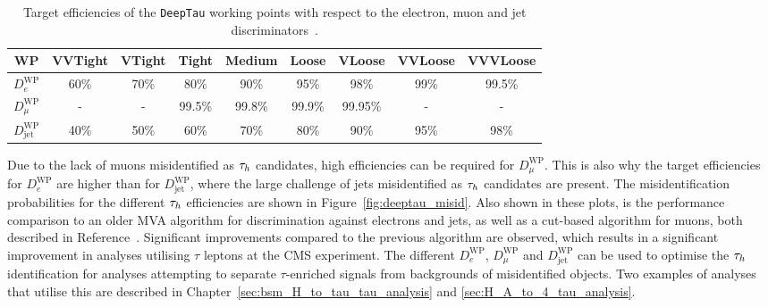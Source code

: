 \begin{table}[t]
\begin{adjustwidth}{-1cm}{-1cm}
\centering
\begin{tabular}{|c|cccccccc|}
\hline
WP                     & VVTight & VTight & Tight  & Medium & Loose  & VLoose  & VVLoose & VVVLoose \\
\hline 
\hline
$D_{e}^{\text{WP}}$    & 60\%    & 70\%   & 80\%   & 90\%   & 95\%   & 98\%    & 99\%    & 99.5\%   \\
$D_{\mu}^{\text{WP}}$  & -       & -      & 99.5\% & 99.8\% & 99.9\% & 99.95\% & -       & -        \\
$D_{\text{jet}}^{\text{WP}}$ & 40\%    & 50\%   & 60\%   & 70\%   & 80\%   & 90\%    & 95\%    & 98\%     \\
\hline
\end{tabular}
\end{adjustwidth}
\caption[Target efficiencies of the \texttt{DeepTau} working points.]{Target efficiencies of the \texttt{DeepTau} working points with respect to the electron, muon and jet discriminators~\cite{CMS:2022prd}.}
\label{tab:deeptau_eff}
\end{table}

Due to the lack of muons misidentified as $\tau_{h}$ candidates, high efficiencies can be required for $D_{\mu}^{\text{WP}}$.
This is also why the target efficiencies for $D_{e}^{\text{WP}}$ are higher than for $D_{\text{jet}}^{\text{WP}}$, where the large challenge of jets misidentified as $\tau_{h}$ candidates are present.
The misidentification probabilities for the different $\tau_{h}$ efficiencies are shown in Figure~\ref{fig:deeptau_misid}.
Also shown in these plots, is the performance comparison to an older \ac{MVA} algorithm for discrimination against electrons and jets, as well as a cut-based algorithm for muons, both described in Reference~\cite{CMS:2018jrd}.
Significant improvements compared to the previous algorithm are observed, which results in a significant improvement in analyses utilising $\tau$ leptons at the \ac{CMS} experiment.
The different $D_{e}^{\text{WP}}$, $D_{\mu}^{\text{WP}}$ and $D_{\text{jet}}^{\text{WP}}$ can be used to optimise the $\tau_{h}$ identification for analyses attempting to separate $\tau$-enriched signals from backgrounds of misidentified objects.
Two examples of analyses that utilise this are described in Chapter~\ref{sec:bsm_H_to_tau_tau_analysis} and \ref{sec:H_A_to_4_tau_analysis}.

